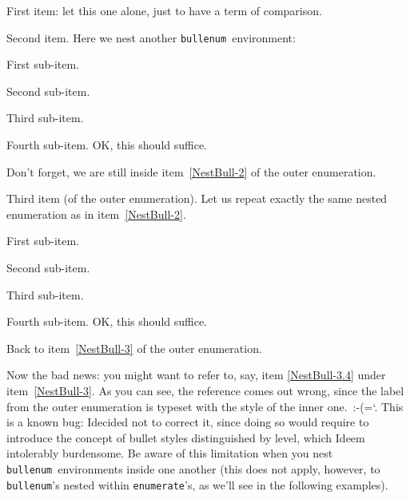 \documentclass[a4paper]{article}
\DeclareRobustCommand*{\env}[1]{\texttt{#1}}
\newcommand*{\Bullenum}{bullenum}
\newcommand*{\Enumerat}{enumerate}
\newcommand*{\beenv}{\env{\Bullenum}}
\newcommand*{\enenv}{\env{\Enumerat}}
\begin{document}
\begin{bullenum}
	\largectrbull

	\item
		First item: let this one alone, just to have a term of
		comparison.

	\item\label{NestBull-2}
		Second item.  Here we nest another \beenv\ environment:
		\begin{bullenum}
			\renewcommand*{\counterlargebullet}{\textperiodcentered}
			\renewcommand*{\countersmallbullet}{\textperiodcentered}
			\item\label{NestBull-2.1}
				First sub-item.
			\item\label{NestBull-2.2}
				Second sub-item.
			\item\label{NestBull-2.3}
				Third sub-item.
			\item\label{NestBull-2.4}
				Fourth sub-item.  OK, this should suffice.
		\end{bullenum}
		Don't forget, we are still inside item~\ref{NestBull-2} of
		the outer enumeration.

	\item\label{NestBull-3}
		Third item (of the outer enumeration).  Let us repeat exactly
		the same nested enumeration as in item~\ref{NestBull-2}.
		\begin{bullenum}
			\renewcommand*{\counterlargebullet}{\textperiodcentered}
			\renewcommand*{\countersmallbullet}{\textperiodcentered}
			\item\label{NestBull-3.1}
				First sub-item.
			\item\label{NestBull-3.2}
				Second sub-item.
			\item\label{NestBull-3.3}
				Third sub-item.
			\item\label{NestBull-3.4}
				Fourth sub-item.  OK, this should suffice.
		\end{bullenum}
		Back to item~\ref{NestBull-3} of the outer enumeration.
\end{bullenum}

Now the bad news: you might want to refer to, say, item
\ref{NestBull-3.4} under item~\ref{NestBull-3}.  As you can see, the
reference comes out wrong, since the label from the outer enumeration
is typeset with the style of the inner one.~:-(\spacefactor=\sfcode`.
\space This is a known bug: I\@ decided not to correct it, since doing
so would require to introduce the concept of bullet styles
distinguished by level, which I\@ deem intolerably burdensome.  Be
aware of this limitation when you nest \beenv\ environments inside one
another (this does not apply, however, to \beenv's nested within
\enenv's, as we'll see in the following examples).
\end{document}
